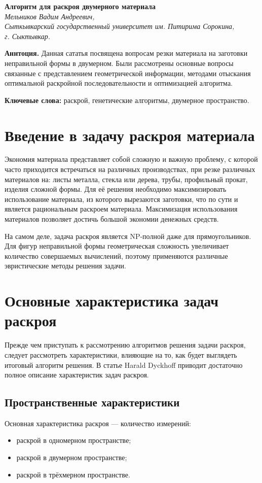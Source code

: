 \documentclass[14pt]{extarticle}
\begin{document}
	\begin{flushright}
		\textbf{Алгоритм для раскроя двумерного материала}\\
		\textit{\small Мельников Вадим Андреевич,\\ Сыткывкарский государственный университет им. Питирима Сорокина,\\ г. Сыктывкар.}
	\end{flushright}


	\textbf{Аннтоция.} Данная сататья посвящена вопросам резки материала на заготовки неправильной формы в двумерном. Были рассмотрены основные вопросы связанные с представлением геометрической информации, методами отыскания оптимальной раскройной последовательности и оптимизацией алгоритма.


	\textbf{Ключевые слова:} раскрой, генетические алгоритмы, двумерное пространство.
	\section{Введение в задачу раскроя материала}
	Экономия материала представляет собой сложную и важную проблему, с которой
	часто приходится встречаться на различных производствах, при резке различных материалов на: листы металла, стекла или дерева, трубы, профильный прокат, изделия сложной формы. Для её решения необходимо максимизировать использование материала, из которого вырезаются заготовки, что по сути и является рациональным раскроем материала. Максимизация использования материалов позволяет достичь большой экономии денежных средств.
	
	
	На самом деле, задача раскроя является NP-полной даже для прямоугольников. Для
	фигур неправильной формы геометрическая сложность увеличивает количество совершаемых вычислений, поэтому применяются различные эвристические методы решения задачи.
	\section{Основные характеристика задач раскроя}
	Прежде чем приступать к рассмотрению алгоритмов решения задачи раскроя, следует рассмотреть характеристики, влияющие на то, как будет выглядеть итоговый алгоритм решения. В статье \cite{Dyckhoff} Harald Dyckhoff приводит достаточно полное описание характеристик задач раскроя.
	\subsection{Пространственные характеристики}
	Основная характеристика раскроя --- количество измерений:
	\begin{itemize}
		\item раскрой в одномерном пространстве;
		\item раскрой в двумерном пространстве;
		\item раскрой в трёхмерном пространстве.
	\end{itemize}
\end{document}
